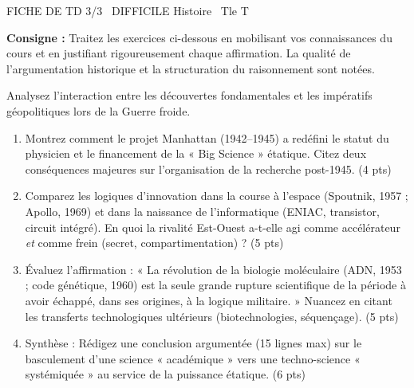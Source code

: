 \documentclass[11pt]{article}
\begin{document}
\begin{tcolorbox}[enhanced,colback=popink,colframe=popink,arc=10pt,boxrule=0pt,left=12pt,right=12pt,top=9pt,bottom=9pt]
{\color{white}\popxbold\small FICHE DE TD 3/3 \textbullet\ DIFFICILE \hfill Histoire \textbullet\ Tle T\par}
\end{tcolorbox}
\vspace{4pt}
\noindent\textbf{Consigne :} Traitez les exercices ci-dessous en mobilisant vos connaissances du cours et en justifiant rigoureusement chaque affirmation. La qualité de l'argumentation historique et la structuration du raisonnement sont notées.

\begin{exercice}
Analysez l'interaction entre les découvertes fondamentales et les impératifs géopolitiques lors de la Guerre froide.
\begin{enumerate}
    \item Montrez comment le projet Manhattan (1942--1945) a redéfini le statut du physicien et le financement de la « Big Science » étatique. Citez deux conséquences majeures sur l'organisation de la recherche post-1945. \hfill (4 pts)
    \item Comparez les logiques d'innovation dans la course à l'espace (Spoutnik, 1957 ; Apollo, 1969) et dans la naissance de l'informatique (ENIAC, transistor, circuit intégré). En quoi la rivalité Est-Ouest a-t-elle agi comme accélérateur \textit{et} comme frein (secret, compartimentation) ? \hfill (5 pts)
    \item Évaluez l'affirmation : « La révolution de la biologie moléculaire (ADN, 1953 ; code génétique, 1960) est la seule grande rupture scientifique de la période à avoir échappé, dans ses origines, à la logique militaire. » Nuancez en citant les transferts technologiques ultérieurs (biotechnologies, séquençage). \hfill (5 pts)
    \item Synthèse : Rédigez une conclusion argumentée (15 lignes max) sur le basculement d'une science « académique » vers une techno-science « systémiquée » au service de la puissance étatique. \hfill (6 pts)
\end{enumerate}
\end{exercice}
\end{document}
